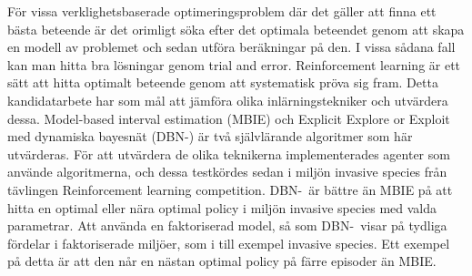 För vissa verklighetsbaserade optimeringsproblem där det gäller att finna ett bästa beteende är det orimligt söka efter det optimala beteendet genom att skapa en modell av problemet och sedan utföra beräkningar på den. I vissa sådana fall kan man hitta bra lösningar genom trial and error. Reinforcement learning är ett sätt att hitta optimalt beteende genom att systematisk pröva sig fram.
Detta kandidatarbete har som mål att jämföra olika inlärningstekniker och utvärdera dessa.
Model-based interval estimation (MBIE) och Explicit Explore or Exploit med dynamiska bayesnät (DBN-\etre) är 
två självlärande algoritmer som här utvärderas.
För att utvärdera de olika teknikerna implementerades agenter som använde algoritmerna, och dessa testkördes sedan 
i miljön invasive species från tävlingen Reinforcement learning competition.
DBN-\etre\ är bättre än MBIE på att hitta en optimal eller nära optimal policy i miljön invasive species med valda parametrar.
Att använda en faktoriserad model, så som DBN-\etre\, visar på tydliga fördelar i faktoriserade miljöer, som i till exempel invasive species. 
Ett exempel på detta är att den når en nästan optimal policy på färre episoder än MBIE.





